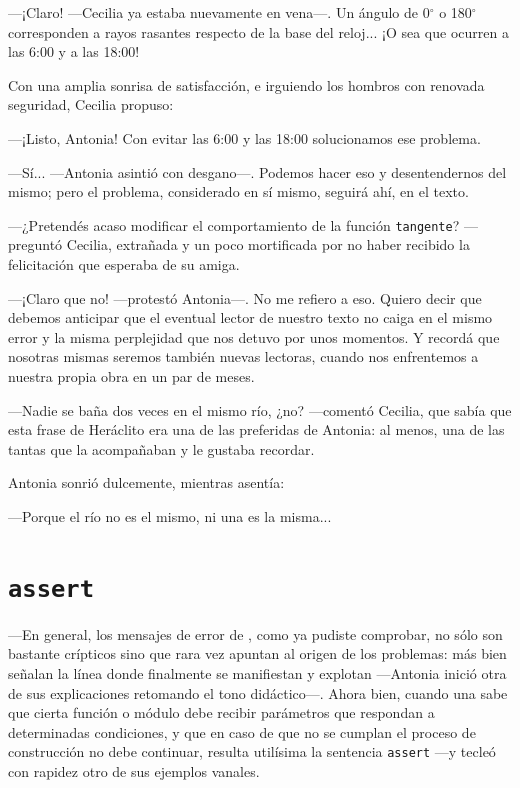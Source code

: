 ---¡Claro! ---Cecilia ya estaba nuevamente en vena---.  Un ángulo de
0$^{\circ}$ o 180$^{\circ}$ corresponden a rayos rasantes respecto de
la base del reloj... ¡O sea que ocurren a las 6:00 y a las 18:00!

Con una amplia sonrisa de satisfacción, e irguiendo los hombros con
renovada seguridad, Cecilia propuso:

---¡Listo, Antonia! Con evitar las 6:00 y las 18:00 solucionamos ese
problema.

---Sí... ---Antonia asintió con desgano---. Podemos hacer eso y
desentendernos del mismo; pero el problema, considerado en sí mismo,
seguirá ahí, en el texto.

---¿Pretendés acaso modificar el comportamiento de la función
\lstinline!tangente!? ---preguntó Cecilia, extrañada y un poco
mortificada por no haber recibido la felicitación que esperaba de su
amiga.

---¡Claro que no! ---protestó Antonia---. No me refiero a eso. Quiero
decir que debemos anticipar que el eventual lector de nuestro texto no
caiga en el mismo error y la misma perplejidad que nos detuvo por unos
momentos. Y recordá que nosotras mismas seremos también nuevas
lectoras, cuando nos enfrentemos a nuestra propia obra en un par de
meses.

---Nadie se baña dos veces en el mismo río, ¿no? ---comentó Cecilia,
que sabía que esta frase de Heráclito era una de las preferidas de
Antonia: al menos, una de las tantas que la acompañaban y le gustaba
recordar.

Antonia sonrió dulcemente, mientras asentía:

---Porque el río no es el mismo, ni una es la misma...

\section{\texttt{assert}}

---En general, los mensajes de error de \openscad{}, como ya pudiste
comprobar, no sólo son bastante crípticos sino que rara vez apuntan al
origen de los problemas: más bien señalan la línea donde finalmente se
manifiestan y explotan ---Antonia inició otra de sus explicaciones
retomando el tono didáctico---. Ahora bien, cuando una sabe que cierta
función o módulo debe recibir parámetros que respondan a determinadas
condiciones, y que en caso de que no se cumplan el proceso de
construcción no debe continuar, resulta utilísima la sentencia
\lstinline!assert! ---y tecleó con rapidez otro de sus ejemplos
vanales.

